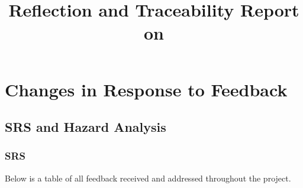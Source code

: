 \documentclass{article}
\title{Reflection and Traceability Report on \progname}
\author{\authname}
\date{}
\begin{document}
\maketitle

\section{Changes in Response to Feedback}
\subsection{SRS and Hazard Analysis}
\subsubsection{SRS}

Below is a table of all feedback received and addressed throughout the project.
\end{document}
